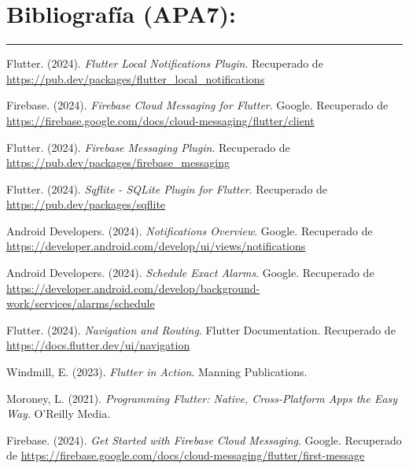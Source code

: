 \documentclass[12pt,a4paper]{article}
\newcommand{\grayline}{\noindent\textcolor{gray}{\rule{\textwidth}{1pt}}}
\begin{document}
\vspace{1cm}

\section*{Bibliografía (APA7):}
\grayline{}
\vspace{0.3cm}

Flutter. (2024). \textit{Flutter Local Notifications Plugin}. Recuperado de \url{https://pub.dev/packages/flutter_local_notifications}

\vspace{0.3cm}

Firebase. (2024). \textit{Firebase Cloud Messaging for Flutter}. Google. Recuperado de \url{https://firebase.google.com/docs/cloud-messaging/flutter/client}

\vspace{0.3cm}

Flutter. (2024). \textit{Firebase Messaging Plugin}. Recuperado de \url{https://pub.dev/packages/firebase_messaging}

\vspace{0.3cm}

Flutter. (2024). \textit{Sqflite - SQLite Plugin for Flutter}. Recuperado de \url{https://pub.dev/packages/sqflite}

\vspace{0.3cm}

Android Developers. (2024). \textit{Notifications Overview}. Google. Recuperado de \url{https://developer.android.com/develop/ui/views/notifications}

\vspace{0.3cm}

Android Developers. (2024). \textit{Schedule Exact Alarms}. Google. Recuperado de \url{https://developer.android.com/develop/background-work/services/alarms/schedule}

\vspace{0.3cm}

Flutter. (2024). \textit{Navigation and Routing}. Flutter Documentation. Recuperado de \url{https://docs.flutter.dev/ui/navigation}

\vspace{0.3cm}

Windmill, E. (2023). \textit{Flutter in Action}. Manning Publications.

\vspace{0.3cm}

Moroney, L. (2021). \textit{Programming Flutter: Native, Cross-Platform Apps the Easy Way}. O'Reilly Media.

\vspace{0.3cm}

Firebase. (2024). \textit{Get Started with Firebase Cloud Messaging}. Google. Recuperado de \url{https://firebase.google.com/docs/cloud-messaging/flutter/first-message}
\end{document}
